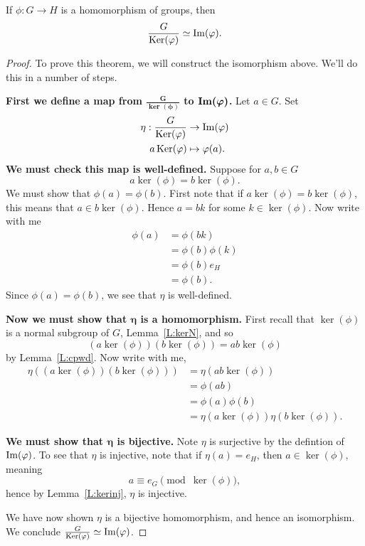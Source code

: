 \documentclass{ximera}
\begin{document}
\begin{theorem}\label{T:NI}
  If $\phi:G\to H$ is a homomorphism of groups, then
  \[
  \frac{G}{\mathop{\mathrm{Ker}}\nolimits(\varphi)} \simeq \operatorname{Im}(\varphi).
  \]
  \begin{proof}
    To prove this theorem, we will construct the isomorphism
    above. We'll do this in a number of steps.


    \textbf{First we define a map from
      $\boldsymbol{\frac{G}{\ker(\phi)}}$ to
      $\boldsymbol{\operatorname{Im}(\varphi)}$.}  Let $a\in G$. Set
    \begin{align*}
      \eta: \frac{G}{\mathop{\mathrm{Ker}}\nolimits(\varphi)} &\to \operatorname{Im}(\varphi)\\
      a\mathop{\mathrm{Ker}}\nolimits(\varphi) &\mapsto \varphi(a).
    \end{align*}
    \textbf{We must check this map is
      well-defined.} Suppose for $a,b\in G$
    \[
    a \ker(\phi) = b\ker(\phi).
    \]
    We must show that $\phi(a) = \phi(b)$. First note that if $a
    \ker(\phi) = b\ker(\phi)$, this means that $a\in
    b\ker(\phi)$. Hence $a = bk$ for some $k\in\ker(\phi)$. Now write
    with me
    \begin{align*}
      \phi(a) &=\phi(bk)\\
      &=\phi(b)\phi(k)\\
      &=\phi(b) e_H\\
      &=\phi(b).
    \end{align*}
    Since $\phi(a) = \phi(b)$, we see that $\eta$ is well-defined.


    
    \textbf{Now we must show that $\boldsymbol\eta$ is a
      homomorphism.} First recall that $\ker(\phi)$ is a normal
    subgroup of $G$, Lemma~\ref{L:kerN}, and so
    \[
    (a\ker(\phi)) (b\ker(\phi))  =  ab\ker(\phi)
    \]
    by Lemma~\ref{L:cpwd}.  Now write with me,
    \begin{align*}
    \eta\left((a\ker(\phi))( b\ker(\phi))\right) &= \eta(ab\ker(\phi))\\
    &= \phi(ab)\\
    &= \phi(a)\phi(b)\\
    &= \eta(a\ker(\phi)) \eta(b\ker(\phi)).
    \end{align*}



    \textbf{We must show that $\boldsymbol\eta$ is bijective.} Note
    $\eta$ is surjective by the defintion of $\operatorname{Im}(\varphi)$.  To see that
    $\eta$ is injective, note that if $\eta(a) = e_H$, then $a\in
    \ker(\phi)$, meaning
    \[
    a\equiv e_G \pmod{\ker(\phi)},
    \]
    hence by Lemma~\ref{L:kerinj}, $\eta$ is injective.

    We have now shown $\eta$ is a bijective homomorphism, and hence an
    isomorphism. We conclude $\frac{G}{\mathop{\mathrm{Ker}}\nolimits(\varphi)} \simeq \operatorname{Im}(\varphi)$.
  \end{proof}
\end{theorem}
\end{document}
